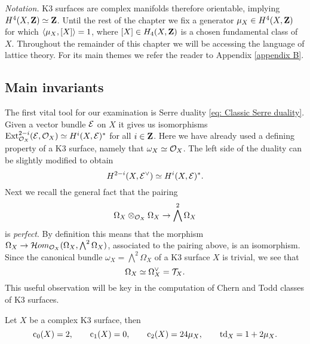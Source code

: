 \noindent
\textsl{Notation.}
K3 surfaces are complex manifolds therefore orientable, implying $H^{4}(X, \mathbf Z) \simeq \mathbf Z$. Until the rest of the chapter we fix a generator $\mu_X \in H^{4}(X, \mathbf Z)$ for which $\langle \mu_X, [X] \rangle = 1$, where $[X] \in H_4(X, \mathbf Z)$ is a chosen fundamental class of $X$. Throughout the remainder of this chapter we will be accessing the language of lattice theory. For its main themes we refer the reader to Appendix \ref{appendix B}.

\subsection{Main invariants}

The first vital tool for our examination is Serre duality \eqref{eq: Classic Serre duality}. Given a vector bundle $\mathcal E$ on $X$ it gives us isomorphisms $\operatorname{Ext}_{{\mathcal{O}_{X}}}^{2-i}(\mathcal E, {\mathcal{O}_{X}}) \simeq H^{i}(X, \mathcal E)^*$ for all $i \in \mathbf Z$. Here we have already used a defining property of a K3 surface, namely that $\omega_X \simeq {\mathcal{O}_{X}}$. The left side of the duality can be slightly modified to obtain 
\begin{equation}
    \label{eq: Serre duality on K3}
    H^{2-i}(X, \mathcal E^\vee) \simeq H^{i}(X, \mathcal E)^*.
\end{equation}
Next we recall the general fact that the pairing
\[
    \Omega_X \otimes_{\mathcal{O}_{X}} \Omega_X \to \bigwedge^2\Omega_X
\]
is \emph{perfect}. By definition this means that the morphism $\Omega_X \to \localhom[X](\Omega_X, \bigwedge^2 \Omega_X)$, associated to the pairing above, is an isomorphism. Since the canonical bundle $\omega_X = \bigwedge^2 \Omega_X$ of a K3 surface $X$ is trivial, we see that 
\[
    \Omega_X \simeq \Omega_X^\vee = \mathcal{T}_{X}.
\]
This useful observation will be key in the computation of Chern and Todd classes of K3 surfaces. 

\begin{lemma}
    \label{characteristic classes of K3}
    \emph{\cite[\S 4, Lemma 4.7]{vanBree2020}}
    Let $X$ be a complex K3 surface, then
    \[
        \cclass[0](X) = 2, \qquad \cclass[1](X) = 0, \qquad \cclass[2](X) = 24\mu_X,  \qquad \tdclass{X} = 1 + 2\mu_X.
    \]
\end{lemma}

